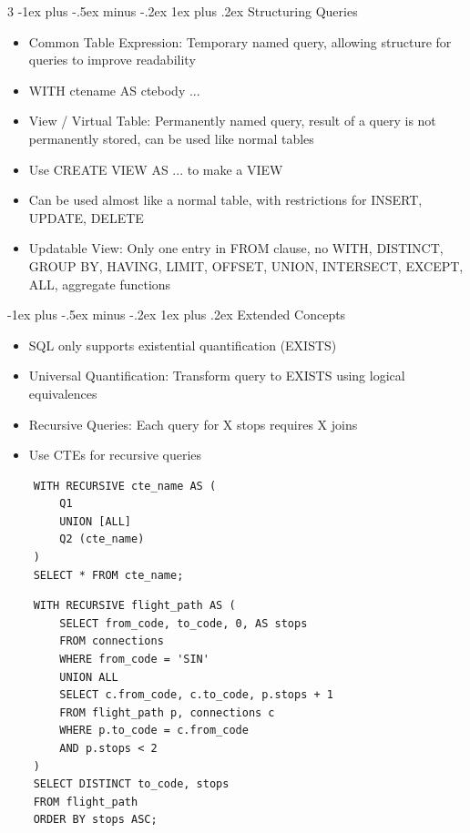 \documentclass[10pt, landscape]{article}
\makeatletter
\renewcommand{\subsection}{\@startsection{subsection}{3}{0mm}%
                                {-1ex plus -.5ex minus -.2ex}%
                                {1ex plus .2ex}%
                                {\normalfont\small\bfseries}}%
\makeatother
\begin{document}
\begin{multicols*}{3}
\subsection{Structuring Queries}
\begin{itemize}
    \item Common Table Expression: Temporary named query, allowing structure for queries to improve readability
    \item WITH ctename AS ctebody ...
    \item View / Virtual Table: Permanently named query, result of a query is not permanently stored, can be used like normal tables
    \item Use CREATE VIEW AS ... to make a VIEW
    \item Can be used almost like a normal table, with restrictions for INSERT, UPDATE, DELETE
    \item Updatable View: Only one entry in FROM clause, no WITH, DISTINCT, GROUP BY, HAVING, LIMIT, OFFSET, UNION, INTERSECT, EXCEPT, ALL, aggregate functions
\end{itemize}

\subsection{Extended Concepts}
\begin{itemize}
    \item SQL only supports existential quantification (EXISTS)
    \item Universal Quantification: Transform query to EXISTS using logical equivalences
    \item Recursive Queries: Each query for X stops requires X joins
    \item Use CTEs for recursive queries
\end{itemize}
\begin{verbatim}
    WITH RECURSIVE cte_name AS (
        Q1
        UNION [ALL]
        Q2 (cte_name)
    )
    SELECT * FROM cte_name;
\end{verbatim}
\begin{verbatim}
    WITH RECURSIVE flight_path AS (
        SELECT from_code, to_code, 0, AS stops
        FROM connections
        WHERE from_code = 'SIN'
        UNION ALL
        SELECT c.from_code, c.to_code, p.stops + 1
        FROM flight_path p, connections c
        WHERE p.to_code = c.from_code
        AND p.stops < 2
    )
    SELECT DISTINCT to_code, stops
    FROM flight_path
    ORDER BY stops ASC;
\end{verbatim}


\end{multicols*}
\end{document}
